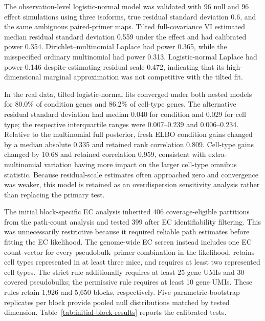 \documentclass[11pt]{article}
\begin{document}
The observation-level logistic-normal model was validated with 96 null and 96 effect simulations using three isoforms, true residual standard deviation 0.6, and the same ambiguous paired-primer maps. Tilted full-covariance VI estimated median residual standard deviation 0.559 under the effect and had calibrated power 0.354. Dirichlet--multinomial Laplace had power 0.365, while the misspecified ordinary multinomial had power 0.313. Logistic-normal Laplace had power 0.146 despite estimating residual scale 0.472, indicating that its high-dimensional marginal approximation was not competitive with the tilted fit.

In the real data, tilted logistic-normal fits converged under both nested models for 80.0\% of condition genes and 86.2\% of cell-type genes. The alternative residual standard deviation had median 0.040 for condition and 0.029 for cell type; the respective interquartile ranges were 0.007--0.239 and 0.006--0.234. Relative to the multinomial full posterior, fresh ELBO condition gains changed by a median absolute 0.335 and retained rank correlation 0.809. Cell-type gains changed by 10.68 and retained correlation 0.959, consistent with extra-multinomial variation having more impact on the larger cell-type omnibus statistic. Because residual-scale estimates often approached zero and convergence was weaker, this model is retained as an overdispersion sensitivity analysis rather than replacing the primary test.

The initial block-specific EC analysis inherited 406 coverage-eligible partitions from the path-count analysis and tested 399 after EC identifiability filtering. This was unnecessarily restrictive because it required reliable path estimates before fitting the EC likelihood. The genome-wide EC screen instead includes one EC count vector for every pseudobulk--primer combination in the likelihood, retains cell types represented in at least three mice, and requires at least two represented cell types. The strict rule additionally requires at least 25 gene UMIs and 30 covered pseudobulks; the permissive rule requires at least 10 gene UMIs. These rules retain 1,926 and 5,650 blocks, respectively. Five parametric-bootstrap replicates per block provide pooled null distributions matched by tested dimension. Table~\ref{tab:initial-block-results} reports the calibrated tests.
\end{document}
